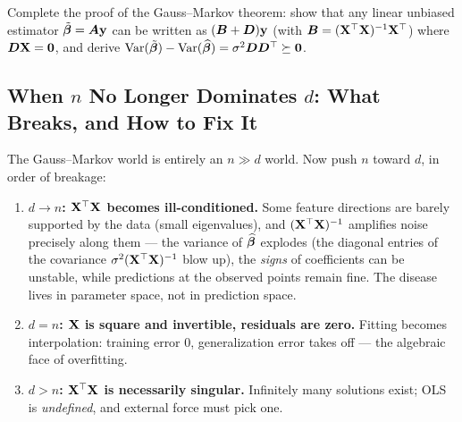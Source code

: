 \begin{exercise}\label{ex:gm}
Complete the proof of the Gauss--Markov theorem: show that any linear unbiased estimator $\tilde{\bm{\beta}} = \bm{A}\mathbf{y}$ can be written as $(\bm{B} + \bm{D})\mathbf{y}$ (with $\bm{B} = (\mathbf{X}^\top\mathbf{X})^{-1}\mathbf{X}^\top$) where $\bm{D}\mathbf{X} = \mathbf{0}$, and derive $\mathrm{Var}(\tilde{\bm{\beta}}) - \mathrm{Var}(\widehat{\bm{\beta}}) = \sigma^2 \bm{D}\bm{D}^\top \succeq \mathbf{0}$.
\end{exercise}

\subsection{When $n$ No Longer Dominates $d$: What Breaks, and How to Fix It}\label{sec:hd-break}

The Gauss--Markov world is entirely an $n \gg d$ world. Now push $n$ toward $d$, in order of breakage:

\begin{enumerate}[label=(\arabic*)]
  \item \textbf{$d \to n$: $\mathbf{X}^\top\mathbf{X}$ becomes ill-conditioned.} Some feature directions are barely supported by the data (small eigenvalues), and $(\mathbf{X}^\top\mathbf{X})^{-1}$ amplifies noise precisely along them — the variance of $\widehat{\bm{\beta}}$ explodes (the diagonal entries of the covariance $\sigma^2(\mathbf{X}^\top\mathbf{X})^{-1}$ blow up), the \textit{signs} of coefficients can be unstable, while predictions at the observed points remain fine. The disease lives in parameter space, not in prediction space.
  \item \textbf{$d = n$: $\mathbf{X}$ is square and invertible, residuals are zero.} Fitting becomes interpolation: training error $0$, generalization error takes off — the algebraic face of overfitting.
  \item \textbf{$d > n$: $\mathbf{X}^\top\mathbf{X}$ is necessarily singular.} Infinitely many solutions exist; OLS is \textit{undefined}, and external force must pick one.
\end{enumerate}

